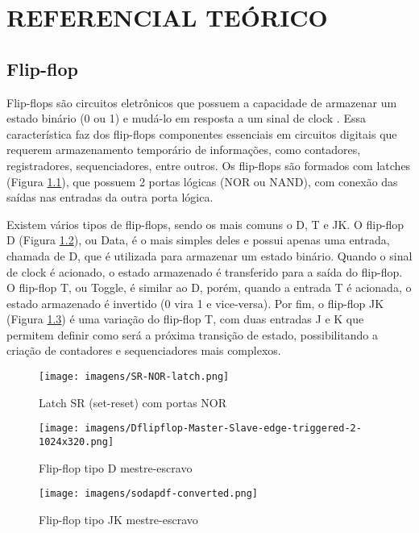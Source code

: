 \chapter{REFERENCIAL TEÓRICO}

\section{Flip-flop}
Flip-flops são circuitos eletrônicos que possuem a capacidade de armazenar um estado binário (0 ou 1) e mudá-lo em resposta a um sinal de clock \cite{floyd}. Essa característica faz dos flip-flops componentes essenciais em circuitos digitais que requerem armazenamento temporário de informações, como contadores, registradores, sequenciadores, entre outros. Os flip-flops são formados com latches (Figura \ref{fig:latch}), que possuem 2 portas lógicas (NOR ou NAND), com conexão das saídas nas entradas da outra porta lógica.

Existem vários tipos de flip-flops, sendo os mais comuns o D, T e JK. O flip-flop D (Figura \ref{fig:ffTipoD}), ou Data, é o mais simples deles e possui apenas uma entrada, chamada de D, que é utilizada para armazenar um estado binário. Quando o sinal de clock é acionado, o estado armazenado é transferido para a saída do flip-flop. O flip-flop T, ou Toggle, é similar ao D, porém, quando a entrada T é acionada, o estado armazenado é invertido (0 vira 1 e vice-versa). Por fim, o flip-flop JK (Figura \ref{fig:ffTipoJK}) é uma variação do flip-flop T, com duas entradas J e K que permitem definir como será a próxima transição de estado, possibilitando a criação de contadores e sequenciadores mais complexos.

\begin{figure}[!h]
    \centering
    \texttt{[image: imagens/SR-NOR-latch.png]}
    \caption{Latch SR (set-reset) com portas NOR}
    \label{fig:latch}
\end{figure}

\begin{figure}[!h]
    \centering
    \texttt{[image: imagens/Dflipflop-Master-Slave-edge-triggered-2-1024x320.png]}
    \caption{Flip-flop tipo D mestre-escravo}
    \label{fig:ffTipoD}
\end{figure}

\begin{figure}[!h]
    \centering
    \texttt{[image: imagens/sodapdf-converted.png]}
    \caption{Flip-flop tipo JK mestre-escravo}
    \label{fig:ffTipoJK}
\end{figure}

